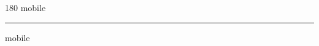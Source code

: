 
\begin{frame}
\begin{center}
\begin{turn}{180}
{\fontsize{2.5cm}{1em}\selectfont mobile}
\end{turn}
\vspace{1em}\par  
\hrule
\vspace{1em}\par  
{\fontsize{2.5cm}{1em}\selectfont mobile}
\end{center}
\end{frame}
